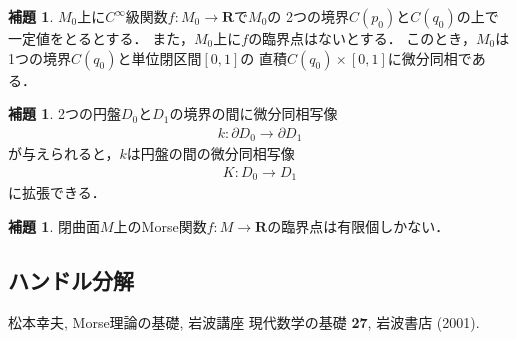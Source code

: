 \documentclass[11pt, a4paper, dvipdfmx]{jsarticle}
\theoremstyle{definition}
\newcommand{\rr}{\mathbf{R}}
\newcommand{\p}{\partial}
\theoremstyle{mystyle}
\newtheorem{LMM}[Axiom]{補題}
\numberwithin{equation}{section} %
\begin{document}
\begin{LMM}
    $M_0$上に$C^{\infty}$級関数$f\colon M_0\to\rr$で$M_0$の
    2つの境界$C(p_0)$と$C(q_0)$の上で一定値をとるとする．
    また，$M_0$上に$f$の臨界点はないとする．
    このとき，$M_0$は1つの境界$C(q_0)$と単位閉区間$[0,1]$の
    直積$C(q_0)\times[0,1]$に微分同相である．
\end{LMM}

\begin{LMM}2つの円盤$D_0$と$D_1$の境界の間に微分同相写像
    \begin{align}
        k\colon\p D_0\to\p D_1
    \end{align}
    が与えられると，$k$は円盤の間の微分同相写像
    \begin{align}
        K\colon D_0\to D_1
    \end{align}
    に拡張できる．
\end{LMM}

\begin{LMM}
    閉曲面$M$上のMorse関数$f\colon M\to\rr$の臨界点は有限個しかない．
\end{LMM}
\subsection{ハンドル分解}






\begin{thebibliography}{15}

 松本幸夫, Morse理論の基礎, 岩波講座 現代数学の基礎 {\bf 27}, 岩波書店 (2001).

\end{thebibliography}
\end{document}
